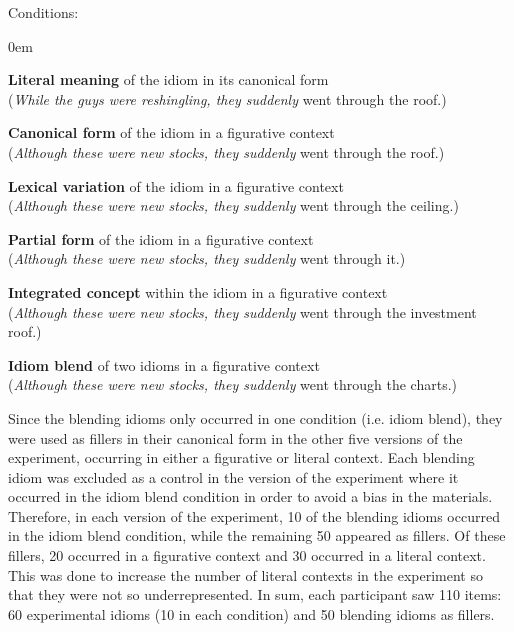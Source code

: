 \documentclass[output=paper,modfonts,nonflat]{langsci/langscibook}
\begin{document}
{\sc Conditions:}
\begin{enumerate}
\small{
\itemsep0em
\item 	{\bf Literal meaning} of the idiom in its canonical form\\
	(\textit{While the guys were reshingling, they suddenly} went through the roof.)
\item 	{\bf Canonical form} of the idiom in a figurative context\\
	(\textit{Although these were new stocks, they suddenly} went through the roof.)
\item	{\bf Lexical variation} of the idiom in a figurative context\\
	(\textit{Although these were new stocks, they suddenly} went through the ceiling.)
\item	{\bf Partial form} of the idiom in a figurative context\\
	(\textit{Although these were new stocks, they suddenly} went through it.)
\item	{\bf Integrated concept} within the idiom in a figurative context\\
	(\textit{Although these were new stocks, they suddenly} went through the investment roof.)
\item	{\bf Idiom blend} of two idioms in a figurative context\\
	(\textit{Although these were new stocks, they suddenly} went through the charts.)
	}
\end{enumerate}


Since the blending idioms only occurred in one condition (i.e. idiom blend), they were used as fillers in their canonical form in the other five versions of the experiment, occurring in either a figurative or literal context. Each blending idiom was excluded as a control in the version of the experiment where it occurred in the idiom blend condition in order to avoid a bias in the materials. Therefore, in each version of the experiment, 10 of the blending idioms occurred in the idiom blend condition, while the remaining 50 appeared as fillers. Of these fillers, 20 occurred in a figurative context and 30 occurred in a literal context. This was done to increase the number of literal contexts in the experiment so that they were not so underrepresented. In sum, each participant saw 110 items: 60 experimental idioms (10 in each condition) and 50 blending idioms as fillers.
\end{document}
